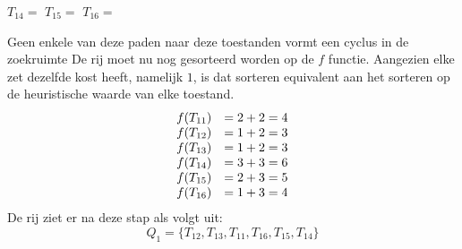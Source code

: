 \documentclass[alternative-exam.tex]{subfiles}
\begin{document}
\begin{center}
$T_{14} = $
$T_{15} = $
$T_{16} = $
\end{center}
Geen enkele van deze paden naar deze toestanden vormt een cyclus in de zoekruimte De rij moet nu nog gesorteerd worden op de $f$ functie. Aangezien elke zet dezelfde kost heeft, namelijk $1$, is dat sorteren equivalent aan het sorteren op de heuristische waarde van elke toestand.
\[
\begin{array}{c c}
f(T_{11}) &= 2 + 2 = 4\\
f(T_{12}) &= 1 + 2 = 3\\
f(T_{13}) &= 1 + 2 = 3\\
f(T_{14}) &= 3 + 3 = 6\\
f(T_{15}) &= 2 + 3 = 5\\
f(T_{16}) &= 1 + 3 = 4\\
\end{array}
\]
De rij ziet er na deze stap als volgt uit:
\[
Q_1 = \{T_{12}, T_{13}, T_{11}, T_{16}, T_{15}, T_{14}\}
\]
\end{document}
